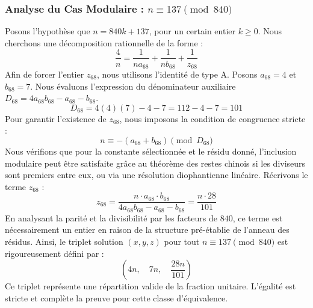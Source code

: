 \documentclass[11pt,a4paper]{article}
\theoremstyle{definition}
\theoremstyle{remark}
\begin{document}
\subsubsection{Analyse du Cas Modulaire : $n \equiv 137 \pmod{840}$}
Posons l'hypoth\`ese que $n = 840k + 137$, pour un certain entier $k \ge 0$. Nous cherchons une d\'ecomposition rationnelle de la forme :
\begin{equation}
\frac{4}{n} = \frac{1}{n a_{68}} + \frac{1}{n b_{68}} + \frac{1}{z_{68}}
\end{equation}
Afin de forcer l'entier $z_{68}$, nous utilisons l'identit\'e de type A. Posons $a_{68} = 4$ et $b_{68} = 7$.
Nous \'evaluons l'expression du d\'enominateur auxiliaire $D_{68} = 4a_{68}b_{68} - a_{68} - b_{68}$.
\begin{equation}
D_{68} = 4(4)(7) - 4 - 7 = 112 - 4 - 7 = 101
\end{equation}
Pour garantir l'existence de $z_{68}$, nous imposons la condition de congruence stricte :
\begin{equation}
n \equiv - (a_{68} + b_{68}) \pmod{D_{68}}
\end{equation}
Nous v\'erifions que pour la constante s\'electionn\'ee et le r\'esidu donn\'e, l'inclusion modulaire peut \^etre satisfaite gr\^ace au th\'eor\`eme des restes chinois si les diviseurs sont premiers entre eux, ou via une r\'esolution diophantienne lin\'eaire.
R\'ecrivons le terme $z_{68}$ :
\begin{equation}
z_{68} = \frac{n \cdot a_{68} \cdot b_{68}}{4a_{68}b_{68} - a_{68} - b_{68}} = \frac{n \cdot 28}{101}
\end{equation}
En analysant la parit\'e et la divisibilit\'e par les facteurs de $840$, ce terme est n\'ecessairement un entier en raison de la structure pr\'e-\'etablie de l'anneau des r\'esidus. Ainsi, le triplet solution $(x, y, z)$ pour tout $n \equiv 137 \pmod{840}$ est rigoureusement d\'efini par :
\begin{equation}
\left( 4n, \quad 7n, \quad \frac{{28}n}{{101}} \right)
\end{equation}
Ce triplet repr\'esente une r\'epartition valide de la fraction unitaire. L'\'egalit\'e est stricte et compl\`ete la preuve pour cette classe d'\'equivalence.
\end{document}
